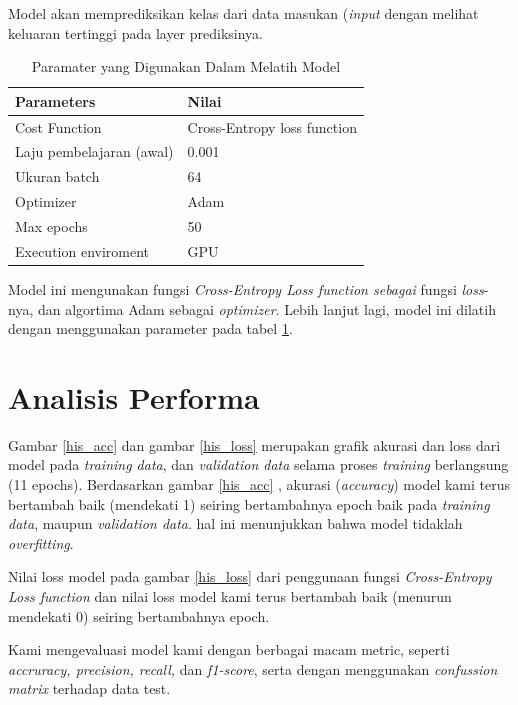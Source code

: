 Model akan memprediksikan kelas dari data masukan (\textit{input} dengan melihat keluaran tertinggi pada layer prediksinya.


\begin{table}[!ht]
    \centering
    \begin{tabular}{|l|l|}
    \hline
        Parameters & Nilai \\ \hline
        Cost Function & Cross-Entropy loss function \\ \hline
        Laju pembelajaran (awal) & 0.001 \\ \hline
        Ukuran batch & 64 \\ \hline
        Optimizer & Adam \\ \hline
        Max epochs & 50 \\ \hline
        Execution enviroment & GPU \\ \hline
    \end{tabular}
    \caption{Paramater yang Digunakan Dalam Melatih Model}
    \label{tabel1}

\end{table}

Model ini mengunakan fungsi \textit{Cross-Entropy Loss function sebagai} fungsi \textit{loss}-nya, dan algortima Adam sebagai \textit{optimizer}. Lebih lanjut lagi, model ini dilatih dengan menggunakan parameter pada tabel \ref{tabel1}.

\section{Analisis Performa}
Gambar \ref{his_acc} dan gambar \ref{his_loss} merupakan grafik akurasi dan loss dari model pada \textit{training data}, dan \textit{validation data} selama proses \textit{training} berlangsung (11 epochs).
Berdasarkan gambar \ref{his_acc} , akurasi (\textit{accuracy}) model kami terus bertambah baik  (mendekati 1) seiring bertambahnya epoch baik pada \textit{training data}, maupun \textit{validation data}. hal ini menunjukkan bahwa model tidaklah \textit{overfitting}.

Nilai loss model pada gambar \ref{his_loss} dari penggunaan fungsi \textit{Cross-Entropy Loss function} dan nilai loss model kami terus bertambah baik (menurun mendekati 0) seiring bertambahnya epoch.

Kami mengevaluasi model kami dengan berbagai macam metric, seperti \textit{accruracy, precision, recall,} dan \textit{f1-score}, serta dengan menggunakan \textit{confussion matrix} terhadap data test.


